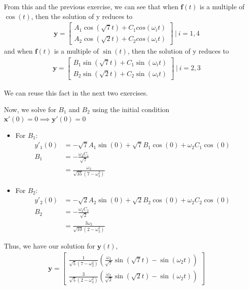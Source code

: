 \documentclass[12pt]{article}
\begin{document}
From this and the previous exercise, we can see that when $\mathbf{f}(t)$ is a multiple of $\cos(t)$, then the solution of y reduces to
\begin{align*}
    \mathbf{y} = \begin{bmatrix}
                     A_1\cos(\sqrt{7}t) + C_1cos(\omega_{i}t) \\
                     A_2\cos(\sqrt{2}t) + C_2cos(\omega_{i}t)
                 \end{bmatrix} ~|~ i = 1,4
\end{align*}
and when $\mathbf{f}(t)$ is a multiple of $\sin(t)$, then the solution of y reduces to
\begin{align*}
    \mathbf{y} = \begin{bmatrix}
                     B_1\sin(\sqrt{7}t) + C_1 \sin(\omega_{i}t) \\
                     B_2\sin(\sqrt{2}t) + C_2 \sin(\omega_{i}t)
                 \end{bmatrix} ~|~ i = 2,3
\end{align*}

We can reuse this fact in the next two exercises.

Now, we solve for $B_1$ and $B_2$ using the initial condition $\mathbf{x}'(0) = 0 \implies{} \mathbf{y}'(0) = 0$
\begin{itemize}
    \item For $B_1$:
          \begin{align*}
              y'_1(0) & = -\sqrt{7}A_1\sin(0) + \sqrt{7}B_1\cos(0) + \omega_{2} C_1 \cos(0) \\
              B_1     & = -\frac{\omega_{2} C_1}{\sqrt{7}}                                  \\
                      & = \frac{\omega_{2}}{\sqrt{35}(7-\omega_2^2)}
          \end{align*}
    \item For $B_2$:
          \begin{align*}
              y'_2(0) & = -\sqrt{2}A_2\sin(0) + \sqrt{2}B_2\cos(0) + \omega_{2} C_2 \cos(0) \\
              B_2     & = -\frac{\omega_{2} C_2}{\sqrt{2}}                                  \\
                      & = \frac{3\omega_{2}}{\sqrt{10}(2-\omega_2^2)}
          \end{align*}
\end{itemize}

Thus, we have our solution for $\mathbf{y}(t)$,
\begin{align*}
    \mathbf{y} = \begin{bmatrix}
                     \frac{1}{\sqrt{5}(7-\omega_2^2)}(\frac{\omega_2}{\sqrt{7}}\sin(\sqrt{7}t) - \sin(\omega_{2}t)) \\
                     \frac{3}{\sqrt{5}(2-\omega_2^2)}(\frac{\omega_2}{\sqrt{2}}\sin(\sqrt{2}t) - \sin(\omega_{2}t))
                 \end{bmatrix}
\end{align*}
\end{document}
